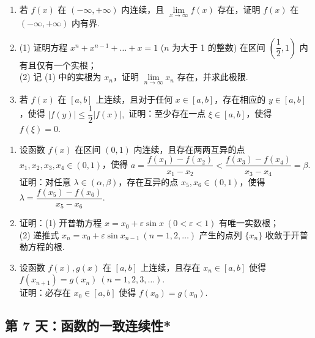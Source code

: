 \begin{enumerate}[label=\textbf{\arabic*.}, itemsep=6.5cm, resume]
    \item 若 $f(x)$ 在 $(-\infty, +\infty)$ 内连续，且 $\lim\limits_{x \to \infty} f(x)$ 存在，证明 $f(x)$ 在 $(-\infty, +\infty)$ 内有界.

    \item (1) 证明方程 $x^n + x^{n-1} + \dots + x = 1$ ($n$ 为大于 1 的整数) 在区间 $(\dfrac{1}{2}, 1)$ 内有且仅有一个实根；\\
    (2) 记 (1) 中的实根为 $x_n$，证明 $\lim\limits_{n \to \infty} x_n$ 存在，并求此极限.

    \item 若 $f(x)$ 在 $[a, b]$ 上连续，且对于任何 $x \in [a, b]$，存在相应的 $y \in [a, b]$，使得
    $|f(y)| \le \dfrac{1}{2} |f(x)|, $
    证明：至少存在一点 $\xi \in [a, b]$，使得 $f(\xi) = 0$.

\end{enumerate}

\newpage

\begin{enumerate}[label=\textbf{\arabic*.}, itemsep=6.5cm, resume]

    \item 设函数 $f(x)$ 在区间 $(0, 1)$ 内连续，且存在两两互异的点 $x_1, x_2, x_3, x_4 \in (0, 1)$，使得
    $ a = \dfrac{f(x_1) - f(x_2)}{x_1 - x_2} < \dfrac{f(x_3) - f(x_4)}{x_3 - x_4} = \beta. $
    证明：对任意 $\lambda \in (\alpha, \beta)$，存在互异的点 $x_5, x_6 \in (0, 1)$，使得
    $\lambda = \dfrac{f(x_5) - f(x_6)}{x_5 - x_6}.$

    \item 证明：(1) 开普勒方程 $x = x_0 + \varepsilon \sin x \ (0 < \varepsilon < 1)$ 有唯一实数根；\\
    (2) 递推式 $x_n = x_0 + \varepsilon \sin x_{n-1} \ (n = 1, 2, \dots)$ 产生的点列 $\{x_n\}$ 收敛于开普勒方程的根.

    \item 设函数 $f(x), g(x)$ 在 $[a, b]$ 上连续，且存在 $x_n \in [a, b]$ 使得 $f(x_{n+1}) = g(x_n) \ (n = 1, 2, 3, \dots)$.\\
    证明：必存在 $x_0 \in [a, b]$ 使得 $f(x_0) = g(x_0)$.

\end{enumerate}

\newpage
\subsection*{第 7 天：函数的一致连续性*}
\vspace{1cm}

